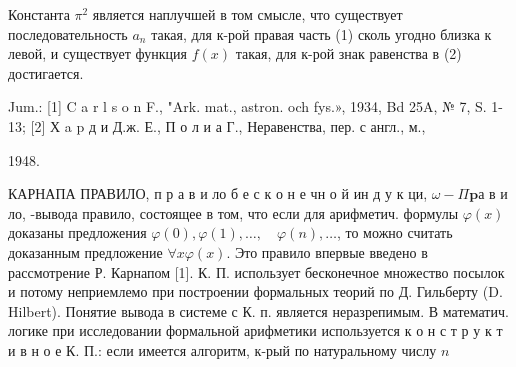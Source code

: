 \documentclass[10pt]{article}
\begin{document}
Константа $\pi^{2}$ является наплучшей в том смысле, что существует последовательность $a_{n}$ такая, для к-рой правая часть (1) сколь угодно близка к левой, и существует функция $f(x)$ такая, для к-рой знак равенства в (2) достигается.



Jum.: [1] C a r l s o n F., "Ark. mat., astron. och fys.», 1934, Bd 25A, № 7, S. 1-13; [2] Х a p д и Д.ж. Е., П о л и а Г., Неравенства, пер. с англ., м.,

1948.



КАРНАПА ПРАВИЛО, п р а в и ло б е с к о н е чн о й ин д у к ци, $\omega-\Pi \mathbf{p} \mathbf{а}$ в и ло, -вывода правило, состоящее в том, что если для арифметич. формулы $\varphi(x)$ доказаны предложения $\varphi(0), \varphi(1), \ldots, \quad \varphi(n), \ldots$, то можно считать доказанным предложение $\forall x \varphi(x)$. Это правило впервые введено в рассмотрение Р. Карнапом [1]. К. П. использует бесконечное множество посылок и потому неприемлемо при построении формальных теорий по Д. Гильберту (D. Hilbert). Понятие вывода в системе с К. п. является неразрепимым. В математич. логике при исследовании формальной арифметики используется к о н с т р у к т и в н о е К. П.: если имеется алгоритм, к-рый по натуральному числу $n$
\end{document}
